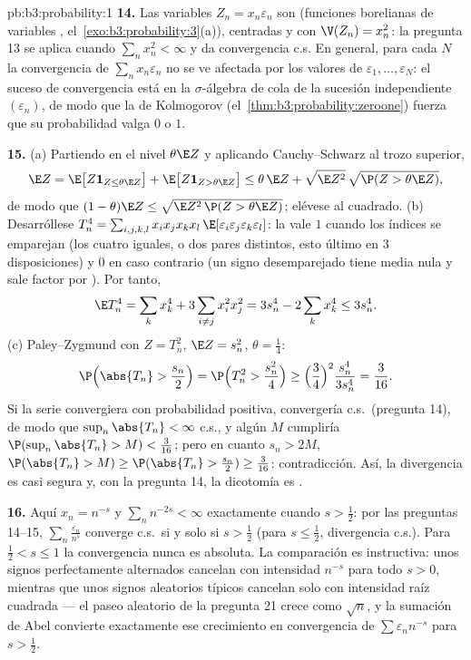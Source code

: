 \begin{solution}{pb:b3:probability:1}
\textbf{14.} Las variables $Z_n = x_n\varepsilon_n$ son
 (funciones
borelianas de variables
,
el~\cref{exo:b3:probability:3}(a)), centradas y con $\V(Z_n) =
x_n^2$: la pregunta 13 se aplica cuando $\sum_nx_n^2 < \infty$ y da
convergencia c.s. En general, para cada $N$ la convergencia de
$\sum_nx_n\varepsilon_n$ no se ve afectada por los valores de
$\varepsilon_1, \dots, \varepsilon_N$: el suceso de convergencia está en
la $\sigma$-álgebra de cola de la sucesión
independiente
$(\varepsilon_n)$, de modo que la
 de Kolmogorov
(el~\cref{thm:b3:probability:zeroone}) fuerza que su probabilidad valga
$0$ o $1$.

\textbf{15.} (a) Partiendo en el nivel $\theta\E Z$ y aplicando
Cauchy--Schwarz al trozo superior,
\[
\E Z = \E\bigl[Z\mathbf 1_{Z \leq \theta\E Z}\bigr] +
\E\bigl[Z\mathbf 1_{Z > \theta\E Z}\bigr]
\leq \theta\,\E Z + \sqrt{\E Z^2}\,
\sqrt{\P(Z > \theta\E Z)} ,
\]
de modo que $(1 - \theta)\E Z \leq \sqrt{\E Z^2\,\P(Z > \theta\E
Z)}$; elévese al cuadrado. (b) Desarróllese $T_n^4 =
\sum_{i,j,k,l}x_ix_jx_kx_l\,
\E[\varepsilon_i\varepsilon_j\varepsilon_k\varepsilon_l]$: la
 vale $1$ cuando los índices
se emparejan (los cuatro iguales, o dos pares distintos, esto último en
$3$ disposiciones) y $0$ en caso contrario (un signo desemparejado tiene
media nula y sale factor por
). Por tanto,
\[
\E T_n^4 = \sum_kx_k^4 + 3\sum_{i\neq j}x_i^2x_j^2 =
3s_n^4 - 2\sum_kx_k^4 \leq 3s_n^4 .
\]
(c) Paley--Zygmund con $Z = T_n^2$, $\E Z = s_n^2$,
$\theta = \frac14$:
\[
\P\Bigl(\abs{T_n} > \frac{s_n}2\Bigr) = \P\Bigl(T_n^2 >
\frac{s_n^2}4\Bigr) \geq \Bigl(\frac34\Bigr)^2
\frac{s_n^4}{3s_n^4} = \frac3{16} .
\]
Si la serie convergiera con probabilidad positiva, convergería c.s.\
(pregunta 14), de modo que $\sup_n\abs{T_n} <
\infty$ c.s., y algún $M$ cumpliría
$\P(\sup_n\abs{T_n} > M) < \frac3{16}$; pero en cuanto $s_n
> 2M$, $\P(\abs{T_n} > M) \geq \P(\abs{T_n} > \frac{s_n}2)
\geq \frac3{16}$: contradicción. Así, la divergencia es casi segura y,
con la pregunta 14, la dicotomía es
.

\textbf{16.} Aquí $x_n = n^{-s}$ y $\sum_nn^{-2s} <
\infty$ exactamente cuando $s > \frac12$: por las preguntas 14--15,
$\sum_n\frac{\varepsilon_n}{n^s}$ converge c.s.\ si y solo si
$s > \frac12$ (para $s \leq \frac12$, divergencia c.s.). Para
$\frac12 < s \leq 1$ la convergencia nunca es absoluta. La comparación
es instructiva: unos signos perfectamente alternados cancelan con
intensidad $n^{-s}$ para todo $s
> 0$, mientras que unos signos aleatorios típicos cancelan solo con
intensidad raíz cuadrada --- el paseo aleatorio de la pregunta 21 crece
como $\sqrt n$, y la sumación de Abel convierte exactamente ese
crecimiento en convergencia de $\sum\varepsilon_nn^{-s}$ para
$s > \frac12$.


\end{solution}
